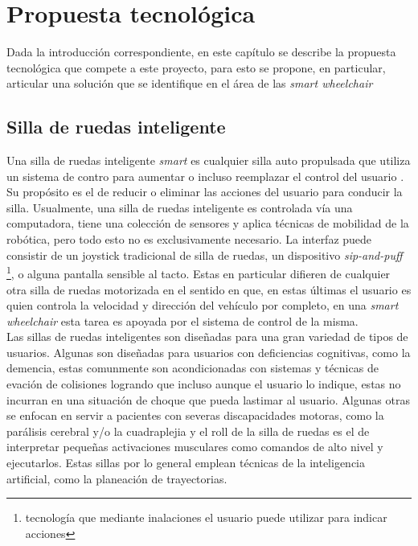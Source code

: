 
\chapter{Propuesta tecnol\'ogica} %

\label{Chapter3} %



Dada la introducci\'on correspondiente, en este cap\'itulo se describe la
propuesta tecnol\'ogica que compete a este proyecto, para esto se propone, en
particular, articular una soluci\'on que se identifique en el \'area de las
\emph{smart wheelchair} 
\section{Silla de ruedas inteligente}
Una silla de ruedas inteligente \emph{smart} es cualquier silla auto propulsada
que utiliza un sistema de contro para aumentar o incluso reemplazar el control
del usuario \parencite{smart}. Su prop\'osito es el de reducir o eliminar las
acciones del usuario para conducir la silla. Usualmente, una silla de ruedas
inteligente es controlada v\'ia una computadora, tiene una colecci\'on de
sensores y aplica t\'ecnicas de mobilidad de la rob\'otica, pero todo esto no es
exclusivamente necesario. La interfaz puede consistir de un joystick tradicional
de silla de ruedas, un dispositivo \emph{sip-and-puff} \footnote{tecnolog\'ia
que mediante inalaciones el usuario puede utilizar para indicar acciones}, o
alguna pantalla sensible al tacto. Estas en particular difieren de cualquier
otra silla de ruedas motorizada en el sentido en que, en estas \'ultimas el
usuario es quien controla la velocidad y direcci\'on del veh\'iculo por
completo, en una \emph{smart wheelchair} esta tarea es apoyada por el sistema de
control de la misma.\\
Las sillas de ruedas inteligentes son dise\~nadas para una gran variedad de
tipos de usuarios. Algunas son dise\~nadas para usuarios con deficiencias
cognitivas, como la demencia, estas comunmente son acondicionadas con sistemas y
t\'ecnicas de evaci\'on de colisiones logrando que incluso aunque el usuario lo
indique, estas no incurran en una situaci\'on de choque que pueda lastimar al
usuario. Algunas otras se enfocan en servir a pacientes con severas
discapacidades motoras, como la par\'alisis cerebral y/o la cuadraplejia y el
roll de la silla de ruedas es el de interpretar peque\~nas activaciones
musculares como comandos de alto nivel y ejecutarlos. Estas sillas por lo
general emplean t\'ecnicas de la inteligencia artificial, como la planeaci\'on
de trayectorias.

